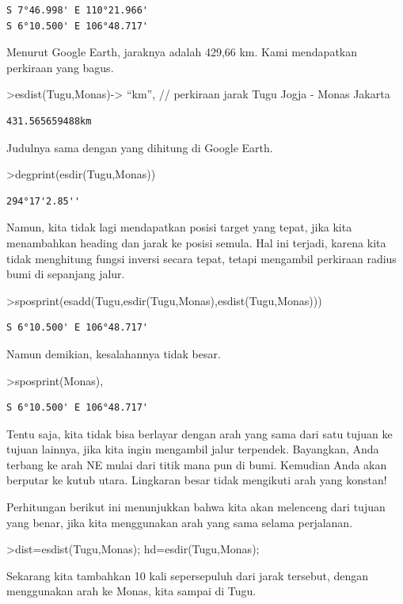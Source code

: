 \documentclass[
]{book}
\begin{document}
\begin{verbatim}
S 7°46.998' E 110°21.966'
S 6°10.500' E 106°48.717'
\end{verbatim}

Menurut Google Earth, jaraknya adalah 429,66 km. Kami mendapatkan perkiraan yang bagus.

\textgreater esdist(Tugu,Monas)-\textgreater{} ``km'', // perkiraan jarak Tugu Jogja - Monas Jakarta

\begin{verbatim}
431.565659488km
\end{verbatim}

Judulnya sama dengan yang dihitung di Google Earth.

\textgreater degprint(esdir(Tugu,Monas))

\begin{verbatim}
294°17'2.85''
\end{verbatim}

Namun, kita tidak lagi mendapatkan posisi target yang tepat, jika kita menambahkan heading dan jarak ke posisi semula. Hal ini terjadi, karena kita tidak menghitung fungsi inversi secara tepat, tetapi mengambil perkiraan radius bumi di sepanjang jalur.

\textgreater sposprint(esadd(Tugu,esdir(Tugu,Monas),esdist(Tugu,Monas)))

\begin{verbatim}
S 6°10.500' E 106°48.717'
\end{verbatim}

Namun demikian, kesalahannya tidak besar.

\textgreater sposprint(Monas),

\begin{verbatim}
S 6°10.500' E 106°48.717'
\end{verbatim}

Tentu saja, kita tidak bisa berlayar dengan arah yang sama dari satu tujuan ke tujuan lainnya, jika kita ingin mengambil jalur terpendek. Bayangkan, Anda terbang ke arah NE mulai dari titik mana pun di bumi. Kemudian Anda akan berputar ke kutub utara. Lingkaran besar tidak mengikuti arah yang konstan!

Perhitungan berikut ini menunjukkan bahwa kita akan melenceng dari tujuan yang benar, jika kita menggunakan arah yang sama selama perjalanan.

\textgreater dist=esdist(Tugu,Monas); hd=esdir(Tugu,Monas);

Sekarang kita tambahkan 10 kali sepersepuluh dari jarak tersebut, dengan menggunakan arah ke Monas, kita sampai di Tugu.
\end{document}
